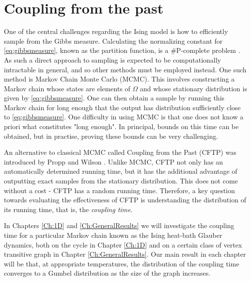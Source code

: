 

\section{Coupling from the past}
	One of the central challenges regarding the Ising model is how to efficiently sample from the Gibbs measure. Calculating the normalizing constant for \eqref{eq:gibbsmeasure}, known as the partition function, is a \#P-complete problem \cite{Jerrum1993-ii}. As such a direct approach to sampling is expected to be computationally intractable in general, and so other methods must be employed instead. One such method is Markov Chain Monte Carlo (MCMC). This involves constructing a Markov chain whose states are elements of $\Omega$ and whose stationary distribution is given by \eqref{eq:gibbsmeasure}. One can then obtain a sample by running this Markov chain for long enough that the output has distribution sufficiently close to \eqref{eq:gibbsmeasure}.
	One difficulty in using MCMC is that one does not know a priori what constitutes "long enough". In principal, bounds on this time can be obtained, but in practise, proving these bounds can be very challenging.

	An alternative to classical MCMC called Coupling from the Past (CFTP) was introduced by Propp and Wilson \cite{Propp1996-cf}. Unlike MCMC, CFTP not only has an automatically determined running time, but it has the additional advantage of outputting exact samples from the stationary distribution. This does not come without a cost - CFTP has a random running time. Therefore, a key question towards evaluating the effectiveness of CFTP is understanding the distribution of its running time, that is, the \emph{coupling time}.

	In Chapters \ref{Ch:1D} and \ref{Ch:GeneralResults} we will investigate the coupling time for a particular Markov chain known as the Ising heat-bath Glauber dynamics, both on the cycle in Chapter \ref{Ch:1D} and on a certain class of vertex transitive graph in Chapter \ref{Ch:GeneralResults}. Our main result in each chapter will be that, at appropriate temperatures, the distribution of the coupling time converges to a Gumbel distribution as the size of the graph increases. 

